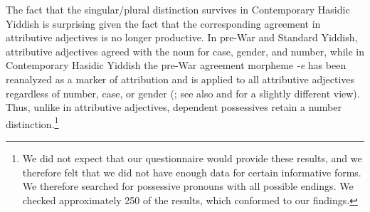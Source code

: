 \documentclass[output=paper, hidelinks]{langscibook}
\begin{document}


The fact that the singular/plural distinction survives in Contemporary Hasidic Yiddish is surprising given the fact that the corresponding agreement in attributive adjectives is no longer productive. In pre-War and Standard Yiddish, attributive adjectives agreed with the noun for case, gender, and number, while in Contemporary Hasidic Yiddish the pre-War agreement morpheme \textit{-e} has been reanalyzed as a marker of attribution and is applied to all attributive adjectives regardless of number, case, or gender (\citealt{Author20, Author21}; see also \citealt[489--496]{Krogh12} and \citealt[42]{Assouline14} for a slightly different view). Thus, unlike in attributive adjectives, dependent possessives retain a number distinction.\footnote{We did not expect that our questionnaire would provide these results, and we therefore felt that we did not have enough data for certain informative forms. We therefore searched \citet{KaveShtiebel} for possessive pronouns with all possible endings. We checked approximately 250 of the results, which conformed to our findings.}
\end{document}
